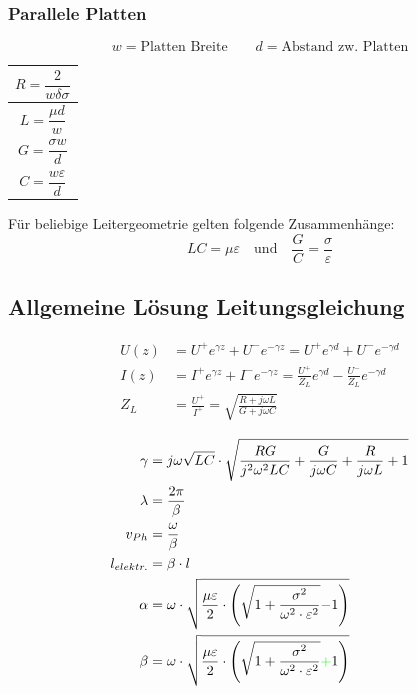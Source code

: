 \subsubsection{Parallele Platten}
\[
    w  = \text{Platten Breite} \qquad d  = \text{Abstand zw. Platten}
\]


{\renewcommand*{\arraystretch}{0.2}
    \begin{tabularx}{0.5\columnwidth}{|X|}
        \hline
        \[R=\frac{2}{w\delta\sigma}\] \\
        \hline
        \[L=\frac{\mu d}{w}\]         \\
        \hline
        \[G=\frac{\sigma w}{d}\]      \\
        \hline
        \[C=\frac{w\varepsilon}{d}\]  \\
        \hline
    \end{tabularx}}

\vspace{1ex}
Für beliebige Leitergeometrie gelten folgende Zusammenhänge:
\[
    LC = \mu\varepsilon \quad \text{und} \quad \frac{G}{C} = \frac{\sigma}{\varepsilon}
\]

\subsection{Allgemeine Lösung Leitungsgleichung}
\begin{align*}
    U(z) & = U^+ e^{\gamma z} + U^- e^{-\gamma z} = U^+ e^{\gamma d} + U^ - e^{-\gamma d}                      \\
    I(z) & = I^+ e^{\gamma z} + I^- e^{-\gamma z} = \frac{U^+}{Z_L}e^{\gamma d} - \frac{U^-}{Z_L}e^{-\gamma d} \\
    Z_L  & = \frac{U^+}{I^+} = \sqrt{ \frac{R + j \omega L}{G + j \omega C}}
\end{align*}

\begin{align*}
    \gamma      & = j \omega \sqrt{LC} \cdot \sqrt{ \frac{RG}{j^2 \omega^2 LC} + \frac{G}{j \omega C} + \frac{R}{j \omega L} + 1}                             \\
    \lambda     & = \frac{2 \pi}{\beta}                                                                                                                       \\
    v_{Ph}      & = \frac{\omega}{\beta}                                                                                                                      \\
    l_{elektr.} & = \beta \cdot l                                                                                                                             \\
    \alpha      & = \omega \cdot \sqrt{\dfrac{\mu \varepsilon}{2}\cdot \left(\sqrt{1+\dfrac{\sigma^2}{\omega^2\cdot\varepsilon^2}}{\color{red}{-}}1\right)}   \\
    \beta       & = \omega \cdot \sqrt{\dfrac{\mu \varepsilon}{2}\cdot \left(\sqrt{1+\dfrac{\sigma^2}{\omega^2\cdot\varepsilon^2}}{\color{green}{+}}1\right)}
\end{align*}

